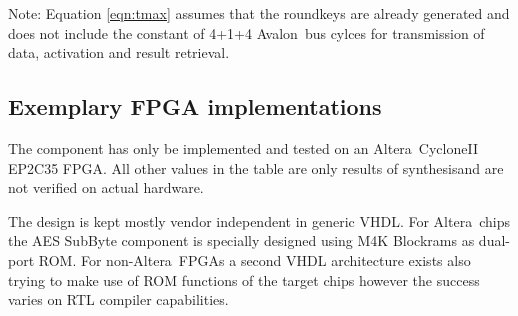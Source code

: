 \documentclass{ruschidoc}
\begin{document}
Note: Equation \ref{eqn:tmax} assumes that the roundkeys are already generated and does not include the constant of 4+1+4
Avalon\rtm\ bus cylces for transmission of data, activation and result retrieval.


\subsection{Exemplary FPGA implementations}

The component has only be implemented and tested on an Altera\rtm\ CycloneII EP2C35
FPGA. All other values in the table are only results of synthesis\footnotemark[0] and are not
verified on actual hardware.


The design is kept mostly vendor independent in generic VHDL. For Altera\rtm\ chips the
AES SubByte component is specially designed using M4K Blockrams as dual-port ROM. For
non-Altera\rtm\ FPGAs a second VHDL architecture exists also trying to make use of
ROM functions of the target chips however the success varies on RTL compiler
capabilities.
\end{document}
